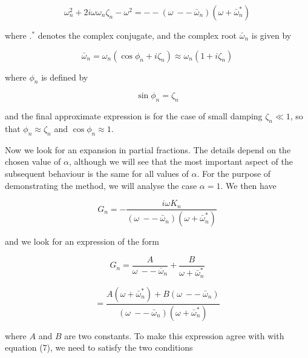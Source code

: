   \begin{equation*}\omega_n^2+2i\omega \omega_n \zeta_n-\omega^2 = -- (\omega 
  \mathrm{~} -- \mathrm{~} \bar{\omega}_n)(\omega + \bar{\omega}^*_n) 
  \tag{4}\end{equation*} 

  \noindent{}where $.^*$ denotes the complex conjugate, and the complex root 
  $\bar{\omega}_n$ is given by 

  \begin{equation*}\bar{\omega}_n=\omega_n (\cos \phi_n + i \zeta_n) \approx 
  \omega_n (1 + i \zeta_n) \tag{5}\end{equation*} 

  \noindent{}where $\phi_n$ is defined by 

  \begin{equation*}\sin \phi_n = \zeta_n \tag{6}\end{equation*} 

  \noindent{}and the final approximate expression is for the case of small 
  damping $\zeta_n \ll 1$, so that $\phi_n \approx \zeta_n$ and $\cos \phi_n 
  \approx 1$. 

  Now we look for an expansion in partial fractions. The details depend on the 
  chosen value of $\alpha$, although we will see that the most important aspect 
  of the subsequent behaviour is the same for all values of $\alpha$. For the 
  purpose of demonstrating the method, we will analyse the case $\alpha = 1$. 
  We then have 

  \begin{equation*}G_n = -\dfrac{i \omega K_n}{(\omega \mathrm{~} -- \mathrm{~} 
  \bar{\omega}_n)(\omega + \bar{\omega}^*_n)} \tag{7}\end{equation*} 

  \noindent{}and we look for an expression of the form 

  \begin{equation*}G_n = \dfrac{A}{\omega \mathrm{~} -- \mathrm{~} 
  \bar{\omega}_n} + \dfrac{B}{\omega + \bar{\omega}^*_n}\end{equation*} 

  \begin{equation*}=\dfrac{A(\omega + \bar{\omega}^*_n) + B(\omega \mathrm{~} 
  -- \mathrm{~} \bar{\omega}_n)}{(\omega \mathrm{~} -- \mathrm{~} 
  \bar{\omega}_n)(\omega + \bar{\omega}^*_n)} \tag{8}\end{equation*} 

  \noindent{}where $A$ and $B$ are two constants. To make this expression agree 
  with with equation (7), we need to satisfy the two conditions 

